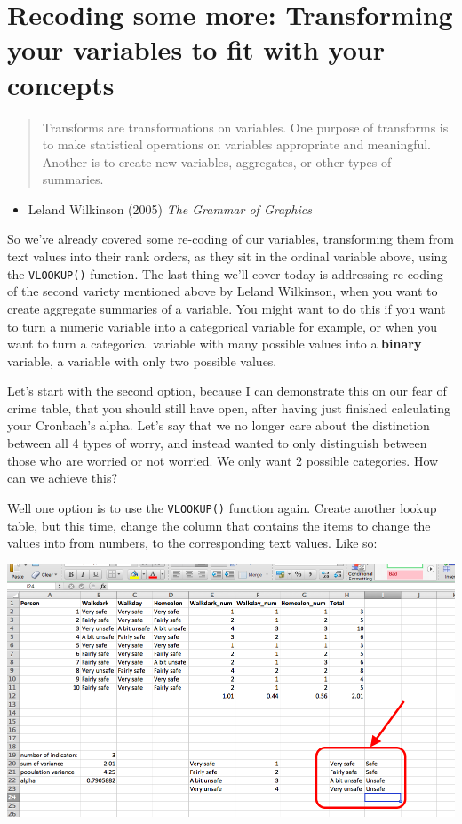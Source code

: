 \documentclass[
]{book}
\providecommand{\tightlist}{%
  \setlength{\itemsep}{0pt}\setlength{\parskip}{0pt}}
\begin{document}
\hypertarget{recoding-some-more-transforming-your-variables-to-fit-with-your-concepts}{%
\section{Recoding some more: Transforming your variables to fit with your concepts}\label{recoding-some-more-transforming-your-variables-to-fit-with-your-concepts}}

\begin{quote}
Transforms are transformations on variables. One purpose of transforms is to make statistical operations on variables appropriate and meaningful. Another is to create new variables, aggregates, or other types of summaries.
\end{quote}

\begin{itemize}
\tightlist
\item
  Leland Wilkinson (2005) \emph{The Grammar of Graphics}
\end{itemize}

So we've already covered some re-coding of our variables, transforming them from text values into their rank orders, as they sit in the ordinal variable above, using the \texttt{VLOOKUP()} function. The last thing we'll cover today is addressing re-coding of the second variety mentioned above by Leland Wilkinson, when you want to create aggregate summaries of a variable. You might want to do this if you want to turn a numeric variable into a categorical variable for example, or when you want to turn a categorical variable with many possible values into a \textbf{binary} variable, a variable with only two possible values.

Let's start with the second option, because I can demonstrate this on our fear of crime table, that you should still have open, after having just finished calculating your Cronbach's alpha. Let's say that we no longer care about the distinction between all 4 types of worry, and instead wanted to only distinguish between those who are worried or not worried. We only want 2 possible categories. How can we achieve this?

Well one option is to use the \texttt{VLOOKUP()} function again. Create another lookup table, but this time, change the column that contains the items to change the values into from numbers, to the corresponding text values. Like so:

\includegraphics{imgs/new_lookup_tab.png}
\end{document}
